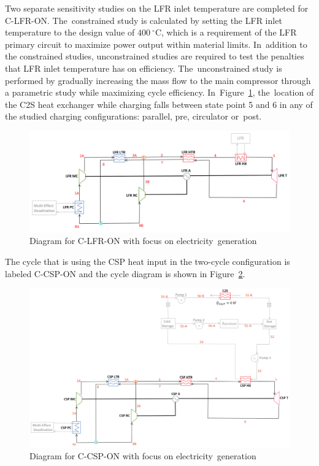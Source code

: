 \documentclass[sustainability,article,accept,moreauthors,pdftex]{Definitions/mdpi}
\begin{document}
\begin{paracol}{2}
Two separate sensitivity studies on the LFR inlet temperature are completed for C-LFR-ON. The~constrained study is calculated by setting the LFR inlet temperature to the design value of $400~^{\circ}$C, which is a requirement of the LFR primary circuit to maximize power output within material limits. In~addition to the constrained studies, unconstrained studies are required to test the penalties that LFR inlet temperature has on efficiency. The~unconstrained study is performed by gradually increasing the mass flow to the main compressor through a parametric study while maximizing cycle efficiency. In~Figure~\ref{c-lfr-on}, the~location of the C2S heat exchanger while charging falls between state point 5 and 6 in any of the studied charging configurations: parallel, pre, circulator or~post. 

 \end{paracol}
\begin{figure}[H] 
   \widefigure
    \includegraphics[width=\linewidth]{Definitions/c-lfr-on.pdf}
    \caption{Diagram for C-LFR-ON with focus on electricity~generation\label{c-lfr-on}}
\end{figure}
 \begin{paracol}{2}

The cycle that is using the CSP heat input in the two-cycle configuration is labeled C-CSP-ON and the cycle diagram is shown in Figure~\ref{c-csp-on}. 

\end{paracol}
\begin{figure}[H] 
    \widefigure
    \includegraphics[width=\linewidth]{Definitions/c-csp-on.pdf}
    \caption{Diagram for C-CSP-ON with focus on electricity~generation\label{c-csp-on}}
\end{figure}
\end{document}
